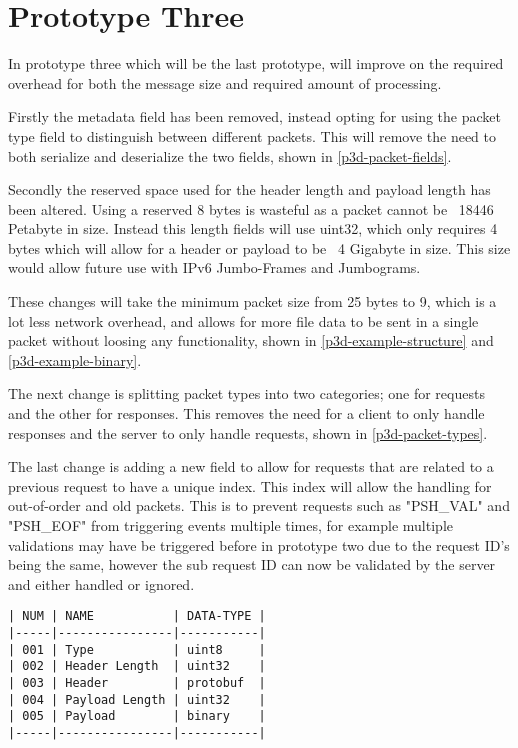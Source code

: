 \section{Prototype Three}
In prototype three which will be the last prototype, will improve on the required overhead for both the message size and required amount of processing.

Firstly the metadata field has been removed, instead opting for using the packet type field to distinguish between different packets. This will remove the need to both serialize and deserialize the two fields, shown in \ref{p3d-packet-fields}.

Secondly the reserved space used for the header length and payload length has been altered. Using a reserved 8 bytes is wasteful as a packet cannot be ~18446 Petabyte in size. Instead this length fields will use uint32, which only requires 4 bytes which will allow for a header or payload to be ~4 Gigabyte in size. This size would allow future use with IPv6 Jumbo-Frames and Jumbograms.

These changes will take the minimum packet size from 25 bytes to 9, which is a lot less network overhead, and allows for more file data to be sent in a single packet without loosing any functionality, shown in \ref{p3d-example-structure} and \ref{p3d-example-binary}.

The next change is splitting packet types into two categories; one for requests and the other for responses. This removes the need for a client to only handle responses and the server to only handle requests, shown in \ref{p3d-packet-types}.

The last change is adding a new field to allow for requests that are related to a previous request to have a unique index. This index will allow the handling for out-of-order and old packets. This is to prevent requests such as "PSH\_VAL" and "PSH\_EOF" from triggering events multiple times, for example multiple validations may have be triggered before in prototype two due to the request ID's being the same, however the sub request ID can now be validated by the server and either handled or ignored.

\FloatBarrier

\begin{lstlisting}[float,caption={Prototype Three Packet Fields},label=p3d-packet-fields]
| NUM | NAME           | DATA-TYPE |
|-----|----------------|-----------|
| 001 | Type           | uint8     |
| 002 | Header Length  | uint32    |
| 003 | Header         | protobuf  |
| 004 | Payload Length | uint32    |
| 005 | Payload        | binary    |
|-----|----------------|-----------|
\end{lstlisting}

